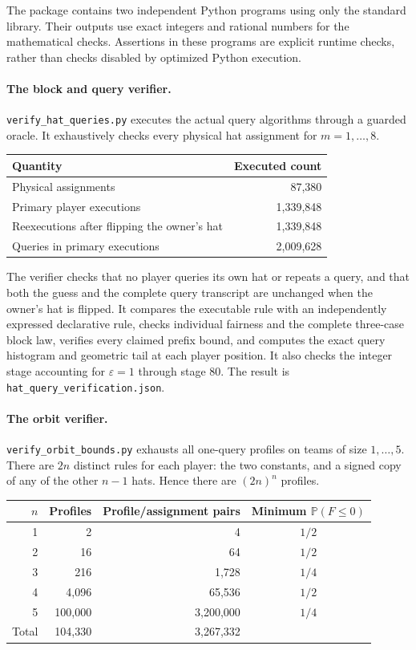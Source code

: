 \documentclass[11pt,letterpaper]{article}
\theoremstyle{definition}
\newcommand{\Prb}{\mathbb P}
\begin{document}
The package contains two independent Python programs using only the
standard library. Their outputs use exact integers and rational
numbers for the mathematical checks. Assertions in these programs
are explicit runtime checks, rather than checks disabled by optimized
Python execution.

\paragraph{The block and query verifier.}
\nolinkurl{verify_hat_queries.py} executes the actual query algorithms
through a guarded oracle. It exhaustively checks every physical hat
assignment for \(m=1,\ldots,8\).

\begin{center}
\begin{tabular}{l r}
\toprule
Quantity&Executed count\\
\midrule
Physical assignments&87,380\\
Primary player executions&1,339,848\\
Reexecutions after flipping the owner's hat&1,339,848\\
Queries in primary executions&2,009,628\\
\bottomrule
\end{tabular}
\end{center}

The verifier checks that no player queries its own hat or repeats a
query, and that both the guess and the complete query transcript are
unchanged when the owner's hat is flipped.
It compares the executable rule with an independently expressed
declarative rule, checks individual fairness and the complete
three-case block law, verifies every claimed prefix bound, and computes
the exact query histogram and geometric tail at each player position.
It also checks the integer stage accounting for \(\varepsilon=1\)
through stage \(80\). The result is
\nolinkurl{hat_query_verification.json}.

\paragraph{The orbit verifier.}
\nolinkurl{verify_orbit_bounds.py} exhausts all one-query profiles on
teams of size \(1,\ldots,5\). There are \(2n\) distinct rules for each
player: the two constants, and a signed copy of any of the other
\(n-1\) hats. Hence there are \((2n)^n\) profiles.

\begin{center}
\begin{tabular}{r r r c}
\toprule
\(n\)&Profiles&Profile/assignment pairs&Minimum \(\Prb(F\le0)\)\\
\midrule
1&2&4&\(1/2\)\\
2&16&64&\(1/2\)\\
3&216&1,728&\(1/4\)\\
4&4,096&65,536&\(1/2\)\\
5&100,000&3,200,000&\(1/4\)\\
\midrule
Total&104,330&3,267,332&\\
\bottomrule
\end{tabular}
\end{center}
\end{document}
